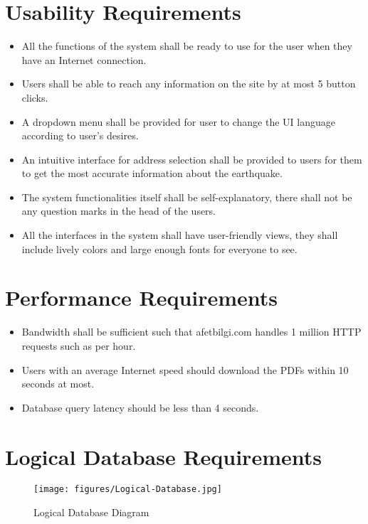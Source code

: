 \documentclass[listof=nochaptergap]{report}
\begin{document}
\section{Usability Requirements}
\begin{itemize}
    \item All the functions of the system shall be ready to use for the user when they have an Internet connection.
    \item Users shall be able to reach any information on the site by at most 5 button clicks.
    \item A dropdown menu shall be provided for user to change the UI language according to user's desires.
    \item An intuitive interface for address selection shall be provided to users for them to get the most accurate information about the earthquake.
    \item The system functionalities itself shall be self-explanatory, there shall not be any question marks in the head of the users.
    \item All the interfaces in the system shall have user-friendly views, they shall include lively colors and large enough fonts for everyone to see.
\end{itemize}

\section{Performance Requirements}

\begin{itemize}
    \item Bandwidth shall be sufficient such that afetbilgi.com handles 1 million HTTP requests such as per hour. 
    \item Users with an average Internet speed should download the PDFs within 10 seconds at most.
    \item Database query latency should be less than 4 seconds.
\end{itemize}

\section{Logical Database Requirements}

        \begin{center}
            \begin{figure}[H]
                \centering
                \texttt{[image: figures/Logical-Database.jpg]}
                \caption{Logical Database Diagram} 
                \label{fig:figure1}
            \end{figure}
        \end{center}
\end{document}
